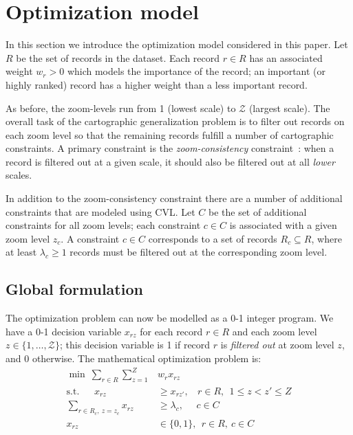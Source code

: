 \section{Optimization model}
\label{sec:optimizationmodel}

In this section we introduce the optimization model considered in this paper. Let $R$ be the set of records in the dataset. Each record $r \in R$ has an associated weight $w_r > 0$ which models the importance of the record; an important (or highly ranked) record has a higher weight than a less important record.

As before, the zoom-levels run from 1 (lowest scale) to $\mathcal{Z}$ (largest scale). The overall task of the cartographic generalization problem is to filter out records on each zoom level so that the remaining records fulfill a number of cartographic constraints. A primary constraint is the \emph{zoom-consistency} constraint~\cite{fusiontables}: when a record is filtered out at a given scale, it should also be filtered out at all \emph{lower} scales. 

In addition to the zoom-consistency constraint there are a number of additional constraints that are modeled using CVL. Let $C$ be the set of additional constraints for all zoom levels; each constraint $c \in C$ is associated with a given zoom level $z_c$. A constraint $c \in C$ corresponds to a set of records $R_c \subseteq R$, where at least $\lambda_c \geq 1$ records must be filtered out at the corresponding zoom level. 

\subsection{Global formulation}

The optimization problem can now be modelled as a 0-1 integer program. We have a 0-1 decision variable $x_{rz}$ for each record $r \in R$ and each zoom level $z \in \{1,\ldots, \mathcal{Z}\}$; this decision variable is 1 if record $r$ is \emph{filtered out} at zoom level $z$, and 0 otherwise. The mathematical optimization problem is:
\begin{align}
  \label{eq:objective}
  \min ~\sum_{r \in R} \sum_{z=1}^Z &w_r x_{rz} \\
  \label{eq:zoom-consistency}
  \mbox{s.t.}~~~~~~~x_{rz} &\geq x_{rz'}, ~~~~r \in R, ~~1 \leq z < z' \leq Z \\
  \label{eq:general-constraints}
  \sum_{r \in R_c, ~z = z_c} x_{rz} &\geq \lambda_c, ~~~~~~ c \in C \\
  x_{rz} & \in \{0, 1\}, ~~ r \in R, ~c \in C
\end{align}

